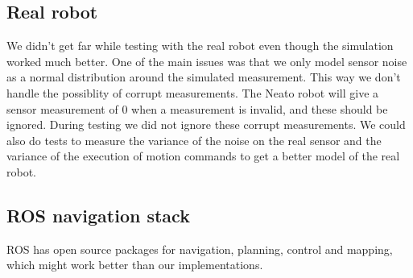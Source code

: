 \subsection{Real robot}
We didn't get far while testing with the real robot even though the simulation worked much better.
One of the main issues was that we only model sensor noise as a normal distribution around the simulated measurement.
This way we don't handle the possiblity of corrupt measurements.
The Neato robot will give a sensor measurement of 0 when a measurement is invalid, and these should be ignored.
During testing we did not ignore these corrupt measurements.
We could also do tests to measure the variance of the noise on the real sensor and the variance of the execution of motion commands to get a better model of the real robot.

\subsection{ROS navigation stack}
ROS has open source packages for navigation, planning, control and mapping, which might work better than our implementations.

